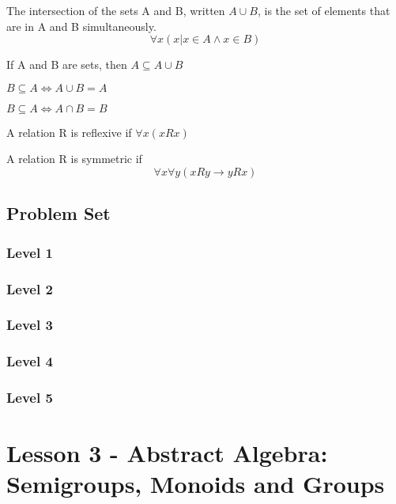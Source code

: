\documentclass{article}
\begin{document}
\begin{definition}[Intersection]
    The intersection of the sets A and B, written \(A \cup B\), is the set of
    elements that are in A and B simultaneously.
    $$ \forall x(x | x \in A \land x \in B) $$
\end{definition}

\begin{theorem}
    If A and B are sets, then \( A \subseteq A \cup B\)
\end{theorem}

\begin{theorem}
    \(B \subseteq A \iff A \cup B = A\)
\end{theorem}

\begin{theorem}
    \(B \subseteq A \iff A \cap B = B\)
\end{theorem}

\begin{definition}[Reflexive]
    A relation R is reflexive if  $ \forall x(x R x) $
\end{definition}

\begin{definition}[Symmetric]
    A relation R is symmetric if $$\forall x \forall y(x R y \rightarrow y R x)$$
\end{definition}

\subsection{Problem Set}
\subsubsection{Level 1}
\subsubsection{Level 2}
\subsubsection{Level 3}
\subsubsection{Level 4}
\subsubsection{Level 5}
\pagebreak

\section{Lesson 3 - Abstract Algebra: Semigroups, Monoids and Groups}
\end{document}

